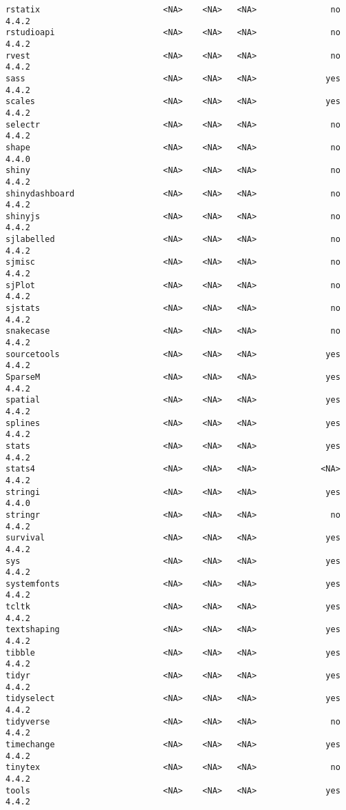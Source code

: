 \documentclass[
  letterpaper,
  DIV=11,
  numbers=noendperiod]{scrreprt}
\begin{document}
\begin{verbatim}
rstatix                         <NA>    <NA>   <NA>               no 4.4.2
rstudioapi                      <NA>    <NA>   <NA>               no 4.4.2
rvest                           <NA>    <NA>   <NA>               no 4.4.2
sass                            <NA>    <NA>   <NA>              yes 4.4.2
scales                          <NA>    <NA>   <NA>              yes 4.4.2
selectr                         <NA>    <NA>   <NA>               no 4.4.2
shape                           <NA>    <NA>   <NA>               no 4.4.0
shiny                           <NA>    <NA>   <NA>               no 4.4.2
shinydashboard                  <NA>    <NA>   <NA>               no 4.4.2
shinyjs                         <NA>    <NA>   <NA>               no 4.4.2
sjlabelled                      <NA>    <NA>   <NA>               no 4.4.2
sjmisc                          <NA>    <NA>   <NA>               no 4.4.2
sjPlot                          <NA>    <NA>   <NA>               no 4.4.2
sjstats                         <NA>    <NA>   <NA>               no 4.4.2
snakecase                       <NA>    <NA>   <NA>               no 4.4.2
sourcetools                     <NA>    <NA>   <NA>              yes 4.4.2
SparseM                         <NA>    <NA>   <NA>              yes 4.4.2
spatial                         <NA>    <NA>   <NA>              yes 4.4.2
splines                         <NA>    <NA>   <NA>              yes 4.4.2
stats                           <NA>    <NA>   <NA>              yes 4.4.2
stats4                          <NA>    <NA>   <NA>             <NA> 4.4.2
stringi                         <NA>    <NA>   <NA>              yes 4.4.0
stringr                         <NA>    <NA>   <NA>               no 4.4.2
survival                        <NA>    <NA>   <NA>              yes 4.4.2
sys                             <NA>    <NA>   <NA>              yes 4.4.2
systemfonts                     <NA>    <NA>   <NA>              yes 4.4.2
tcltk                           <NA>    <NA>   <NA>              yes 4.4.2
textshaping                     <NA>    <NA>   <NA>              yes 4.4.2
tibble                          <NA>    <NA>   <NA>              yes 4.4.2
tidyr                           <NA>    <NA>   <NA>              yes 4.4.2
tidyselect                      <NA>    <NA>   <NA>              yes 4.4.2
tidyverse                       <NA>    <NA>   <NA>               no 4.4.2
timechange                      <NA>    <NA>   <NA>              yes 4.4.2
tinytex                         <NA>    <NA>   <NA>               no 4.4.2
tools                           <NA>    <NA>   <NA>              yes 4.4.2

\end{verbatim}
\end{document}
